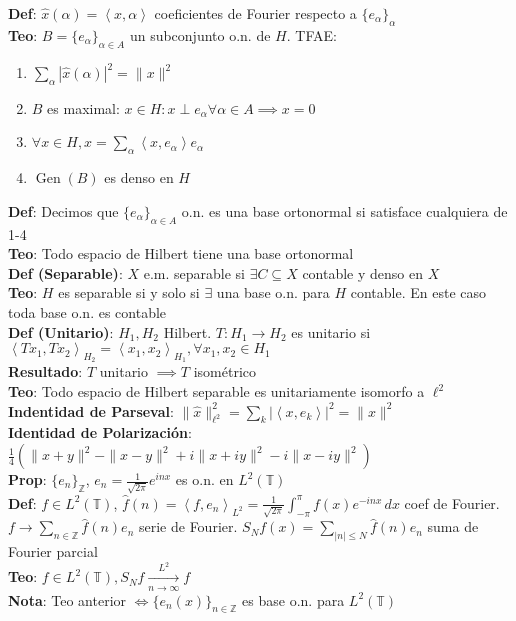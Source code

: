 \documentclass[9pt, letterpaper]{extarticle}
\newcommand{\Z}{\mathbb{Z}}
\newcommand{\T}{\mathbb{T}}
\newcommand{\inn}[1]{\left\langle #1\right\rangle}
\begin{document}
\begin{multicols*}{2}
\textbf{Def}: $\hat x(\alpha)=\inn{x,\alpha}$ coeficientes de Fourier respecto a $\{e_\alpha\}_\alpha$\\
\textbf{\color{red}Teo}: $B=\{e_\alpha\}_{\alpha\in A}$ un subconjunto o.n. de $H$. TFAE:
\begin{enumerate}
	\item $\sum_\alpha |\hat x(\alpha)|^2=\|x\|^2$
	\item $B$ es maximal: $x\in H:x\perp e_\alpha\forall\alpha\in A\implies x=0$
	\item $\forall x\in H,x=\sum_\alpha \inn{x,e_\alpha}e_\alpha$
	\item $\operatorname{Gen}(B)$ es denso en $H$
\end{enumerate}
\textbf{Def}: Decimos que $\{e_\alpha\}_{\alpha\in A}$ o.n. es una base ortonormal si satisface cualquiera de 1-4\\
\textbf{Teo}: Todo espacio de Hilbert tiene una base ortonormal\\
\textbf{Def (Separable)}: $X$ e.m. separable si $\exists C\subseteq X$ contable y denso en $X$\\
\textbf{Teo}: $H$ es separable si y solo si $\exists$ una base o.n. para $H$ contable. En este caso toda base o.n. es contable\\
\textbf{Def (Unitario)}: $H_1,H_2$ Hilbert. $T:H_1\to H_2$ es unitario si $\inn{Tx_1,Tx_2}_{H_2}=\inn{x_1,x_2}_{H_1},\forall x_1,x_2\in H_1$\\
\textbf{Resultado}: $T$ unitario $\implies T$ isométrico\\
\textbf{Teo}: Todo espacio de Hilbert separable es unitariamente isomorfo a $\ell^2$\\
\textbf{Indentidad de Parseval}: $\|\hat x\|_{\ell^2}^2=\sum_k |\inn{x,e_k}|^2=\|x\|^2$\\
\textbf{Identidad de Polarización}: $\frac{1}{4}(\|x+y\|^2-\|x-y\|^2+i\|x+iy\|^2-i\|x-iy\|^2)$\\
\textbf{Prop}: $\{e_n\}_\Z$, $e_n=\frac{1}{\sqrt{2\pi}}e^{inx}$ es o.n. en $L^2(\T)$\\
\textbf{Def}: $f\in L^2(\T)$, $\hat f(n)=\inn{f,e_n}_{L^2}=\frac{1}{\sqrt{2\pi}} \int_{-\pi}^\pi f(x)e^{-inx}\,dx$ coef de Fourier. $f\to \sum_{n\in\Z}\hat f(n)e_n$ serie de Fourier. $S_N f(x)=\sum_{|n|\leq N}\hat f(n)e_n$ suma de Fourier parcial\\
\textbf{Teo}: $f\in L^2(\T), S_Nf\xrightarrow[n\to\infty]{L^2}f$\\
\textbf{Nota}: Teo anterior $\iff \{e_n(x)\}_{n\in\Z}$ es base o.n. para $L^2(\T)$\\

\end{multicols*}
\end{document}
